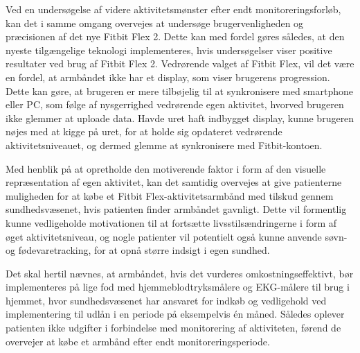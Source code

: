 Ved en undersøgelse af videre aktivitetsmønster efter endt monitoreringsforløb, kan det i samme omgang overvejes at undersøge brugervenligheden og præcisionen af det nye Fitbit Flex 2. Dette kan med fordel gøres således, at den nyeste tilgængelige teknologi implementeres, hvis undersøgelser viser positive resultater ved brug af Fitbit Flex 2. Vedrørende valget af Fitbit Flex, vil det være en fordel, at armbåndet ikke har et display, som viser brugerens progression. Dette kan gøre, at brugeren er mere tilbøjelig til at synkronisere med smartphone eller PC, som følge af nysgerrighed vedrørende egen aktivitet, hvorved brugeren ikke glemmer at uploade data. Havde uret haft indbygget display, kunne brugeren nøjes med at kigge på uret, for at holde sig opdateret vedrørende aktivitetsniveauet, og dermed glemme at synkronisere med Fitbit-kontoen.

Med henblik på at opretholde den motiverende faktor i form af den visuelle repræsentation af egen aktivitet, kan det samtidig overvejes at give patienterne muligheden for at købe et Fitbit Flex-aktivitetsarmbånd med tilskud gennem sundhedsvæsenet, hvis patienten finder armbåndet gavnligt. Dette vil formentlig kunne vedligeholde motivationen til at fortsætte livsstilsændringerne i form af øget aktivitetsniveau, og nogle patienter vil potentielt også kunne anvende søvn- og fødevaretracking, for at opnå større indsigt i egen sundhed. 

Det skal hertil nævnes, at armbåndet, hvis det vurderes omkostningseffektivt, bør implementeres på lige fod med hjemmeblodtryksmålere og EKG-målere til brug i hjemmet, hvor sundhedsvæsenet har ansvaret for indkøb og vedligehold ved implementering til udlån i en periode på eksempelvis én måned. Således oplever patienten ikke udgifter i forbindelse med monitorering af aktiviteten, førend de overvejer at købe et armbånd efter endt monitoreringsperiode.
